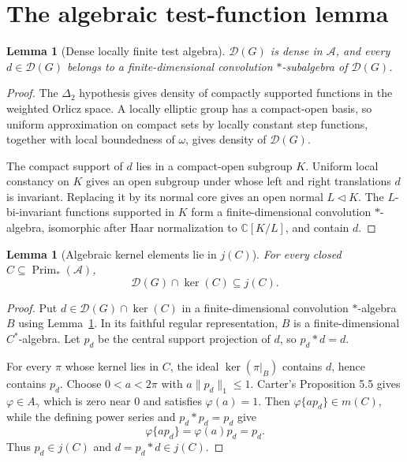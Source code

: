 \documentclass[11pt]{article}
\newtheorem{lemma}[theorem]{Lemma}
\newcommand{\A}{\mathcal A}
\newcommand{\D}{\mathcal D}
\newcommand{\Prim}{\operatorname{Prim}}
\begin{document}
\section{The algebraic test-function lemma}

\begin{lemma}[Dense locally finite test algebra]\label{lem:test}
$\D(G)$ is dense in $\A$, and every $d\in\D(G)$ belongs to a
finite-dimensional convolution $*$-subalgebra of $\D(G)$.
\end{lemma}

\begin{proof}
The $\Delta_2$ hypothesis gives density of compactly supported functions in
the weighted Orlicz space.  A locally elliptic group has a compact-open basis,
so uniform approximation on compact sets by locally constant step functions,
together with local boundedness of $\omega$, gives density of $\D(G)$.

The compact support of $d$ lies in a compact-open subgroup $K$.  Uniform local
constancy on $K$ gives an open subgroup under whose left and right
translations $d$ is invariant.  Replacing it by its normal core gives an open
normal $L\triangleleft K$.  The $L$-bi-invariant functions supported in $K$
form a finite-dimensional convolution $*$-algebra, isomorphic after Haar
normalization to $\mathbb C[K/L]$, and contain $d$.
\end{proof}

\begin{lemma}[Algebraic kernel elements lie in $j(C)$]\label{lem:algebraic}
For every closed $C\subseteq\Prim_*(\A)$,
\[
 \D(G)\cap\ker(C)\subseteq j(C).
\]
\end{lemma}

\begin{proof}
Put $d\in\D(G)\cap\ker(C)$ in a finite-dimensional convolution
$*$-algebra $B$ using Lemma~\ref{lem:test}.  In its faithful regular
representation, $B$ is a finite-dimensional $C^*$-algebra.  Let $p_d$ be the
central support projection of $d$, so $p_d*d=d$.

For every $\pi$ whose kernel lies in $C$, the ideal
$\ker(\pi|_B)$ contains $d$, hence contains $p_d$.  Choose
$0<a<2\pi$ with $a\lVert p_d\rVert_1\leq1$.  Carter's Proposition 5.5 gives
$\varphi\in A_\gamma$ which is zero near $0$ and satisfies $\varphi(a)=1$.
Then $\varphi\{ap_d\}\in m(C)$, while the defining power series and
$p_d*p_d=p_d$ give
\[
 \varphi\{ap_d\}=\varphi(a)p_d=p_d.
\]
Thus $p_d\in j(C)$ and $d=p_d*d\in j(C)$.
\end{proof}
\end{document}
